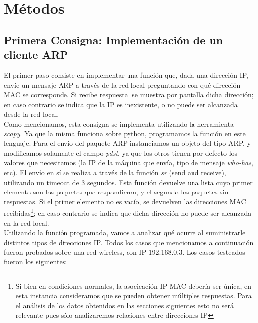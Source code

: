 \section{M\'etodos}


\subsection{Primera Consigna: Implementaci\'on de un cliente ARP}\label{sec:metodos_1}
El primer paso consiste en implementar una funci\'on que, dada una direcci\'on IP, env\'ie un mensaje ARP a trav\'es de la red local preguntando con qu\'e direcci\'on MAC se corresponde. Si recibe respuesta, se muestra por pantalla dicha direcci\'on; en caso contrario se indica que la IP es inexistente, o no puede ser alcanzada desde la red local.\\

Como mencionamos, esta consigna se implementa utilizando la herramienta \emph{scapy}. Ya que la misma funciona sobre python, programamos la funci\'on en este lenguaje. Para el env\'io del paquete ARP instanciamos un objeto del tipo ARP, y modificamos solamente el campo \emph{pdst}, ya que los otros tienen por defecto los valores que necesitamos (la IP de la m\'aquina que env\'ia, tipo de mensaje \emph{who-has}, etc). El env\'io en s\'i se realiza a trav\'es de la funci\'on \emph{sr} (send and receive), utilizando un timeout de 3 segundos. Esta funci\'on devuelve una lista cuyo primer elemento son los paquetes que respondieron, y el segundo los paquetes sin respuestas. Si el primer elemento no es vac\'io, se devuelven las direcciones MAC  recibidas\footnote{Si bien en condiciones normales, la asocicación IP-MAC debería ser única, en esta instancia consideramos que se pueden obtener múltiples respuestas. Para el análisis de los datos obtenidos en las secciones siguientes esto no será relevante pues sólo analizaremos relaciones entre direcciones IP}; en caso contrario se indica que dicha direcci\'on no puede ser alcanzada en la red local. \\

Utilizando la funci\'on programada, vamos a analizar qu\'e ocurre al suministrarle distintos tipos de direcciones IP. Todos los casos que mencionamos a continuaci\'on fueron probados sobre una red wireless, con IP 192.168.0.3. Los casos testeados fueron los siguientes:


